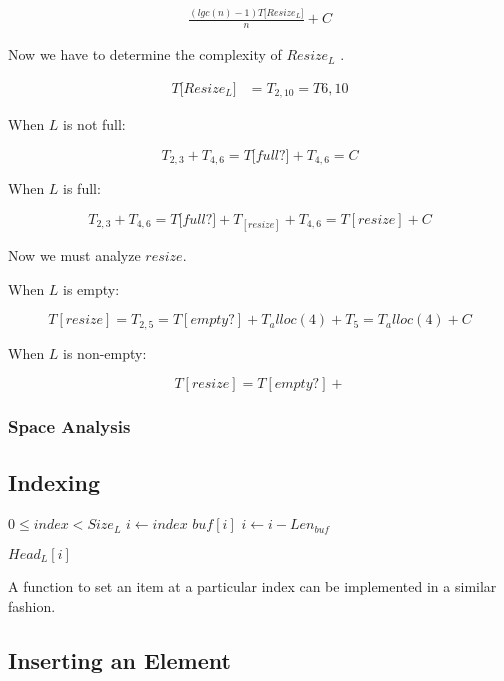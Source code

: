\documentclass{article}
\newcommand{\head}{
	\ensuremath{Head_L}
}
\newcommand{\tail}{
	\ensuremath{Tail_L}
}
\newcommand{\size}{
	\ensuremath{Size_L}
}
\newcommand{\resizefn}{
	\ensuremath{Resize_L}
}
\newcommand{\timeof}[1]{
	\ensuremath{T\big[#1\big]}
}
\begin{document}
	\begin{align*}
	\frac {(lgc(n) - 1)\timeof{\resizefn}} n + C
	\end{align*}
	
	Now we have to determine the complexity of \resizefn.
	
	\begin{align*}
	\timeof{\resizefn} &= T_{2, 10} = T{6,10}
	\end{align*}
	
	When $L$ is not full:
	
	$$
	T_{2,3} + T_{4,6} = \timeof{full?} + T_{4,6} = C
	$$
	
	When $L$ is full:
	
	$$
	T_{2,3} + T_{4,6} = \timeof{full?} + T_[resize] + T_{4,6} = T[resize] + C
	$$
	
	Now we must analyze $resize$.
	
	When $L$ is empty:
	
	$$
	T[resize] = T_{2,5} = T[empty?] + T_alloc(4) + T_5 = T_alloc(4) + C
	$$
	
	When $L$ is non-empty:
	
	$$
	T[resize] = T[empty?] + 
	$$
	
	\subsubsection{Space Analysis}
	
	\subsection{Indexing}
	
	\begin{algorithm}\begin{algorithmic}[1]
	 			\Require
	 				\Statex $0 \leq index < \size$
	 			\State $i \gets index$
	 			\ForAll{$buf \in \tail$}
	 					\State \Return $buf[i]$
	 				\EndIf
	 				\State $i \gets i - Len_{buf}$
	 			\EndFor
	 			
	 			\Return $\head[i]$
 			\EndFunction
		\end{algorithmic}\end{algorithm}

	A function to set an item at a particular index can be implemented in a similar fashion.
	
	\subsection{Inserting an Element}
	
\end{document}
